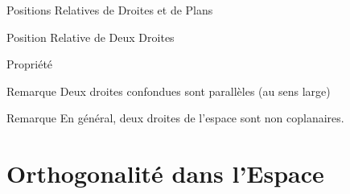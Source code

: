 \documentclass{coursbook}
\begin{document}
\begin{Gpartie}{Positions Relatives de Droites et de Plans}
\begin{Spartie}{Position Relative de Deux Droites}
\begin{SSpartie}{Propriété}
\begin{center}
                    \parbox{\linewidth}{}
                \end{center}
            \end{SSpartie}
            \begin{SSpartie}{Remarque} 
                Deux droites confondues sont parallèles (au sens large)
            \end{SSpartie}
            \begin{SSpartie}{Remarque} 
                En général, deux droites de l'espace sont non coplanaires.
            \end{SSpartie}
        \end{Spartie}
    \end{Gpartie}










    
    \chapter{Orthogonalité dans l'Espace}
    
\end{document}
